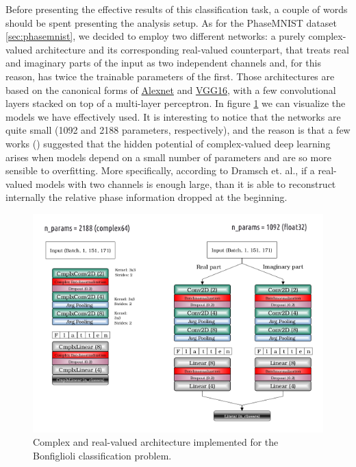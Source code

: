 \documentclass[../main.tex]{subfiles}
\begin{document}
Before presenting the effective results of this classification task, a couple of words should be spent presenting the analysis setup. As for the PhaseMNIST dataset \ref{sec:phasemnist}, we decided to employ two different networks: a purely complex-valued architecture and its corresponding real-valued counterpart, that treats real and imaginary parts of the input as two independent channels and, for this reason, has twice the trainable parameters of the first. Those architectures are based on the canonical forms of \href{https://en.wikipedia.org/wiki/AlexNet}{Alexnet} and \href{https://medium.com/@mygreatlearning/what-is-vgg16-introduction-to-vgg16-f2d63849f615}{VGG16}, with a few convolutional layers stacked on top of a multi-layer perceptron. In figure \ref{fig:bonfiglioli_architectures} we can visualize the models we have effectively used. It is interesting to notice that the networks are quite small (1092 and 2188 parameters, respectively), and the reason is that a few works (\cite{Dramsch_seismic}) suggested that the hidden potential of complex-valued deep learning arises when models depend on a small number of parameters and are so more sensible to overfitting. More specifically, according to Dramsch et. al., if a real-valued models with two channels is enough large, than it is able to reconstruct internally the relative phase information dropped at the beginning.
\begin{figure}[!ht]
	\centering
	\includegraphics[width=\textwidth]{pictures/bonfiglioli_architectures}
	\caption{Complex and real-valued architecture implemented for the Bonfiglioli classification problem.}
	\label{fig:bonfiglioli_architectures}
\end{figure}
\end{document}
